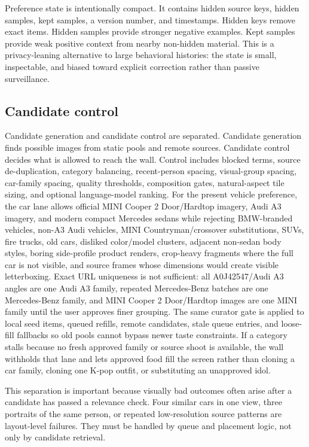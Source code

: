 \documentclass[12pt,letterpaper]{article}
\begin{document}
Preference state is intentionally compact. It contains hidden source keys, hidden samples, kept samples, a version number, and timestamps. Hidden keys remove exact items. Hidden samples provide stronger negative examples. Kept samples provide weak positive context from nearby non-hidden material. This is a privacy-leaning alternative to large behavioral histories: the state is small, inspectable, and biased toward explicit correction rather than passive surveillance.

\subsection{Candidate control}

Candidate generation and candidate control are separated. Candidate generation finds possible images from static pools and remote sources. Candidate control decides what is allowed to reach the wall. Control includes blocked terms, source de-duplication, category balancing, recent-person spacing, visual-group spacing, car-family spacing, quality thresholds, composition gates, natural-aspect tile sizing, and optional language-model ranking. For the present vehicle preference, the car lane allows official MINI Cooper 2 Door/Hardtop imagery, Audi A3 imagery, and modern compact Mercedes sedans while rejecting BMW-branded vehicles, non-A3 Audi vehicles, MINI Countryman/crossover substitutions, SUVs, fire trucks, old cars, disliked color/model clusters, adjacent non-sedan body styles, boring side-profile product renders, crop-heavy fragments where the full car is not visible, and source frames whose dimensions would create visible letterboxing. Exact URL uniqueness is not sufficient: all A0J42547/Audi A3 angles are one Audi A3 family, repeated Mercedes-Benz batches are one Mercedes-Benz family, and MINI Cooper 2 Door/Hardtop images are one MINI family until the user approves finer grouping. The same curator gate is applied to local seed items, queued refills, remote candidates, stale queue entries, and loose-fill fallbacks so old pools cannot bypass newer taste constraints. If a category stalls because no fresh approved family or source shoot is available, the wall withholds that lane and lets approved food fill the screen rather than cloning a car family, cloning one K-pop outfit, or substituting an unapproved idol.

This separation is important because visually bad outcomes often arise after a candidate has passed a relevance check. Four similar cars in one view, three portraits of the same person, or repeated low-resolution source patterns are layout-level failures. They must be handled by queue and placement logic, not only by candidate retrieval.
\end{document}
